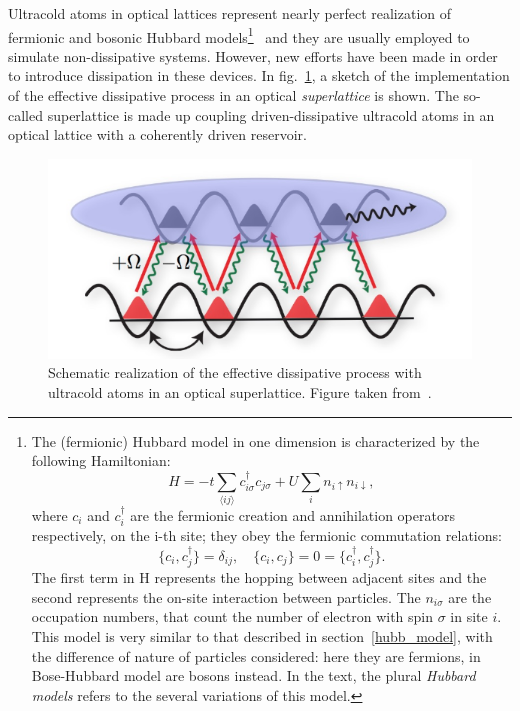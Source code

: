 Ultracold atoms in optical lattices represent nearly perfect realization of fermionic and bosonic Hubbard models\footnote{The (fermionic) Hubbard model in one dimension is characterized by the following Hamiltonian:
\begin{equation*}
    H = -t\sum_{\langle ij \rangle}c^{\dagger}_{i\sigma}c_{j\sigma} + U\sum_i n_{i\uparrow}n_{i\downarrow},
\end{equation*}
where $c_i$ and $c^{\dagger}_i$ are the fermionic creation and annihilation operators respectively, on the i-th site; they obey the fermionic commutation relations:
\begin{equation*}
    \{c_i, c_j^\dagger\} = \delta_{ij}, \quad \{c_i, c_j\} = 0 = \{c_i^\dagger, c_j^\dagger\}.
\end{equation*}
The first term in H represents the hopping between adjacent sites and the second represents the on-site interaction between particles. The $n_{i\sigma}$ are the occupation numbers, that count the number of electron with spin $\sigma$ in site $i$. This model is very similar to that described in section~\ref{hubb_model}, with the difference of nature of particles considered: here they are fermions, in Bose-Hubbard model are bosons instead. 
In the text, the plural \emph{Hubbard models} refers to the several variations of this model.
}~\cite{ultracoldAtoms_condMatter} and they are usually employed to simulate non-dissipative systems. However, new efforts have been made in order to introduce dissipation in these devices. 
In fig.~\ref{fig:optical_lattice_dissipation}, a sketch of the implementation of the effective dissipative process in an optical \emph{superlattice} is shown. The so-called superlattice is made up coupling driven-dissipative ultracold atoms in an optical lattice with a coherently driven reservoir. 

\begin{figure}[H]
    \centering
    \includegraphics[scale=0.7]{Figures/optical_lattice_dissipation.png}
    \captionsetup{width=1.\linewidth}
    \caption{Schematic realization of the effective dissipative process with ultracold atoms in an optical superlattice. Figure taken from~\cite{diehl_wEbsite}.}
    \label{fig:optical_lattice_dissipation}
\end{figure}

